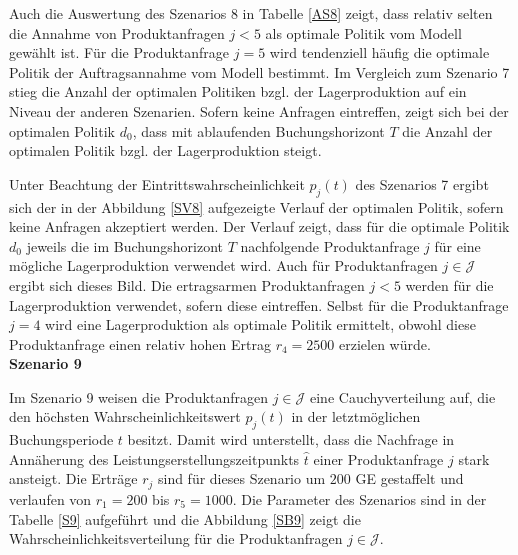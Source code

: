 Auch die Auswertung des Szenarios 8 in Tabelle \ref{AS8} zeigt, dass relativ selten die Annahme von Produktanfragen $j<5$ als optimale Politik vom Modell gewählt ist. Für die Produktanfrage $j=5$ wird tendenziell häufig die optimale Politik der Auftragsannahme vom Modell bestimmt. Im Vergleich zum Szenario 7 stieg die Anzahl der optimalen Politiken bzgl. der Lagerproduktion auf ein Niveau der anderen Szenarien. Sofern keine Anfragen eintreffen, zeigt sich bei der optimalen Politik $d_0$, dass mit ablaufenden Buchungshorizont $T$ die Anzahl der optimalen Politik bzgl. der Lagerproduktion steigt.

Unter Beachtung der Eintrittswahrscheinlichkeit $p_j(t)$ des Szenarios 7 ergibt sich der in der Abbildung \ref{SV8} aufgezeigte Verlauf der optimalen Politik, sofern keine Anfragen akzeptiert werden. Der Verlauf zeigt, dass für die optimale Politik $d_0$ jeweils die im Buchungshorizont $T$ nachfolgende Produktanfrage $j$ für eine mögliche Lagerproduktion verwendet wird. Auch für Produktanfragen $j\in\mathcal{J}$ ergibt sich dieses Bild. Die ertragsarmen Produktanfragen $j<5$ werden für die Lagerproduktion verwendet, sofern diese eintreffen. Selbst für die Produktanfrage $j=4$ wird eine Lagerproduktion als optimale Politik ermittelt, obwohl diese Produktanfrage einen relativ hohen Ertrag $r_4=2500$ erzielen würde.\\[.5cm]

\textbf{Szenario 9}

Im Szenario 9 weisen die Produktanfragen $j\in\mathcal{J}$ eine Cauchyverteilung auf, die den höchsten Wahrscheinlichkeitswert $p_j(t)$ in der letztmöglichen Buchungsperiode $t$ besitzt. Damit wird unterstellt, dass die Nachfrage in Annäherung des Leistungserstellungszeitpunkts $\hat t$ einer Produktanfrage $j$ stark ansteigt. Die Erträge $r_j$ sind für dieses Szenario um $200$ GE gestaffelt und verlaufen von $r_1=200$ bis $r_5=1000$. Die Parameter des Szenarios sind in der Tabelle \ref{S9} aufgeführt und die Abbildung \ref{SB9} zeigt die Wahrscheinlichkeitsverteilung für die Produktanfragen $j\in\mathcal{J}$. 

